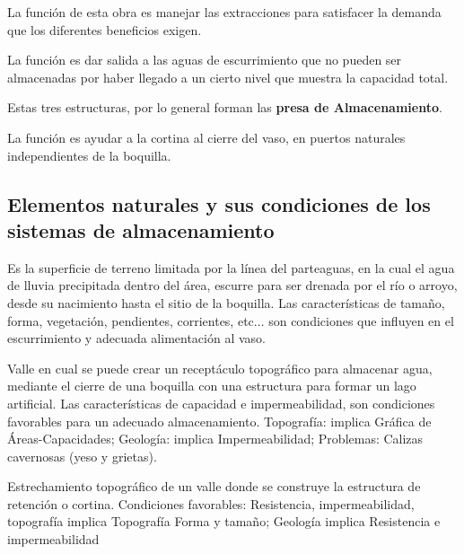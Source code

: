 \begin{definition}
	La función de esta obra es manejar las extracciones para
	satisfacer la demanda que los diferentes beneficios exigen.
\end{definition}

\begin{definition}
	La función es dar salida a las aguas de escurrimiento que
	no pueden ser almacenadas por haber llegado a un cierto nivel que muestra la
	capacidad total.
\end{definition}

Estas tres estructuras, por lo general forman las \textbf{presa de Almacenamiento}.

\begin{definition}
	La función es ayudar a la cortina al cierre del vaso, en puertos
	naturales independientes de la boquilla.
\end{definition}

\subsection{Elementos naturales y sus condiciones de los sistemas de almacenamiento}

\begin{definition}[Cuenca]
	Es la superficie de terreno limitada por la línea del parteaguas, en la cual el agua
	de lluvia precipitada dentro del área, escurre para ser drenada por el río o arroyo,
	desde su nacimiento hasta el sitio de la boquilla.
	Las características de tamaño, forma, vegetación, pendientes, corrientes, etc$\dots$
	son condiciones que influyen en el escurrimiento y adecuada alimentación al vaso.
\end{definition}

\begin{definition}
	Valle en cual se puede crear un receptáculo topográfico para almacenar agua,
	mediante el cierre de una boquilla con una estructura para formar un lago artificial.
	Las características de capacidad e impermeabilidad, son condiciones favorables
	para un adecuado almacenamiento. Topografía: implica Gráfica de Áreas-Capacidades;
	Geología: implica Impermeabilidad; Problemas: Calizas cavernosas (yeso y grietas).
\end{definition}

\begin{definition}[Boquilla]
	Estrechamiento topográfico de un valle donde se construye la estructura de
	retención o cortina. Condiciones favorables: Resistencia, impermeabilidad, topografía implica
	Topografía Forma y tamaño; Geología implica Resistencia e impermeabilidad
\end{definition}

